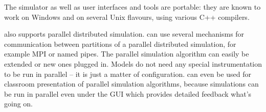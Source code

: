 The simulator as well as user interfaces and tools are portable:
they are known to work on Windows and on several Unix flavours,
using various C++ compilers.

{\opp} also supports parallel distributed simulation. {\opp} can
use several mechanisms for communication between partitions of
a parallel distributed simulation, for example MPI or named pipes.
The parallel simulation algorithm can easily be extended or new
ones plugged in. Models do not need any special instrumentation
to be run in parallel -- it is just a matter of configuration.
{\opp} can even be used for classroom presentation of parallel
simulation algorithms, because simulations can be run in parallel
even under the GUI which provides detailed feedback what's going on.




